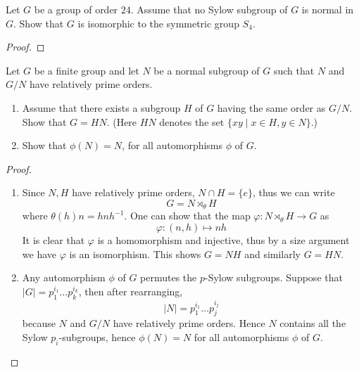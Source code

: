 \begin{prob}[F2018-Q2]
    Let \( G \) be a group of order \( 24 \). Assume that no Sylow subgroup of \( G \) is normal in \( G \). Show that \( G \) is isomorphic to the symmetric group \( S_4 \).
\end{prob}
\begin{proof}
    
\end{proof}


\begin{prob}[F2001-Q1]
    Let \( G \) be a finite group and let \( N \) be a normal subgroup of \( G \) such that \( N \) and \( G/N \) have relatively prime orders.
        
        \begin{enumerate}
            \item Assume that there exists a subgroup \( H \) of \( G \) having the same order as \( G/N \). Show that \( G = HN \). (Here \( HN \) denotes the set \(\{xy \mid x \in H, y \in N\}\).)
            
            \item Show that \( \phi(N) = N \), for all automorphisms \( \phi \) of \( G \).
        \end{enumerate}
\end{prob}
\begin{proof}
    \begin{enumerate}
        \item Since $N,H$ have relatively prime orders, $N\cap H=\{e\}$, thus we can write 
        \begin{equation*}
            G=N\rtimes_\theta H
        \end{equation*}
        where $\theta(h)n=hnh^{-1}$. One can show that the map $\varphi: N\rtimes_\theta H\to G$ as
        \begin{equation*}
            \varphi:(n,h)\mapsto nh
        \end{equation*}
        It is clear that $\varphi$ is a homomorphism and injective, thus by a size argument we have $\varphi$ is an isomorphism. This shows $G=NH$ and similarly $G=HN$.
        \item Any automorphism $\phi$ of $G$ permutes the $p$-Sylow subgroups. Suppose that $|G|=p_1^{i_1}\dots p_k^{i_k}$, then after rearranging,
        \begin{equation*}
            |N|=p_1^{i_1}\dots p_j^{i_j}
        \end{equation*}
        because $N$ and $G/N$ have relatively prime orders. Hence $N$ contains all the Sylow $p_i$-subgroups, hence $\phi(N)=N$ for all automorphisms $\phi$ of $G$.
    \end{enumerate}
\end{proof}


